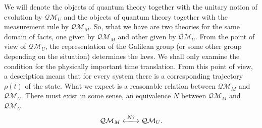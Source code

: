 \documentclass[11pt]{report}
\begin{document}
We will denote the objects of quantum theory together with the unitary notion of evolution by $\mathcal{QM}_U$ and the objects of quantum theory together with the measurement rule by $\mathcal{QM}_M$. So, what we have are two theories for the same domain of facts, one given by $\mathcal{QM}_M$ and other given by $\mathcal{QM}_U$. From the point of view of $\mathcal{QM}_U$, the representation of the Galilean group (or some other group depending on the situation) determines the laws. We shall only examine the condition for the physically important time translation. From this point of view, a description means that for every system there is a corresponding trajectory $\rho(t)$ of the state. What we expect is a reasonable relation between $\mathcal{QM}_M$ and $\mathcal{QM}_U$. There must exist in some sense, an equivalence $N$ between $\mathcal{QM}_M$ and $\mathcal{QM}_U$. 
$$\mathcal{QM}_M\xlongleftrightarrow{N?}\mathcal{QM}_U.$$
\end{document}
